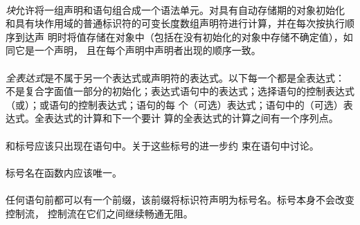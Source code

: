 \paragraph{}
\textit{块}允许将一组声明和语句组合成一个语法单元。对具有自动存储期的对象初始化
和具有块作用域的普通标识符的可变长度数组声明符进行计算，并在每次按执行顺序到达声
明时将值存储在对象中（包括在没有初始化的对象中存储不确定值），如同它是一个声明，
且在每个声明中声明者出现的顺序一致。

\paragraph{}
\textit{全表达式}是不属于另一个表达式或声明符的表达式。以下每一个都是全表达式：
不是复合字面值一部分的初始化；表达式语句中的表达式；选择语句的控制表达式
（或）；或语句的控制表达式；语句的每
个（可选）表达式；语句中的（可选）表达式。全表达式的计算和下一个要计
算的全表达式的计算之间有一个序列点。


\syntax
\paragraph{}

\constraint
\paragraph{}
和标号应该只出现在语句中。关于这些标号的进一步约
束在语句中讨论。

\paragraph{}
标号名在函数内应该唯一。

\semantic
\paragraph{}
任何语句前都可以有一个前缀，该前缀将标识符声明为标号名。标号本身不会改变控制流，
控制流在它们之间继续畅通无阻。


\syntax
\paragraph{}

